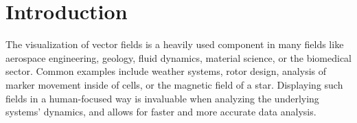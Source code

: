 
\chapter{Introduction}

The visualization of vector fields is a heavily used component in many fields like aerospace engineering, geology, fluid dynamics, material science, or the biomedical sector.
Common examples include weather systems, rotor design, analysis of marker movement inside of cells, or the magnetic field of a star.
Displaying such fields in a human-focused way is invaluable when analyzing the underlying systems' dynamics, and allows for faster and more accurate data analysis.

